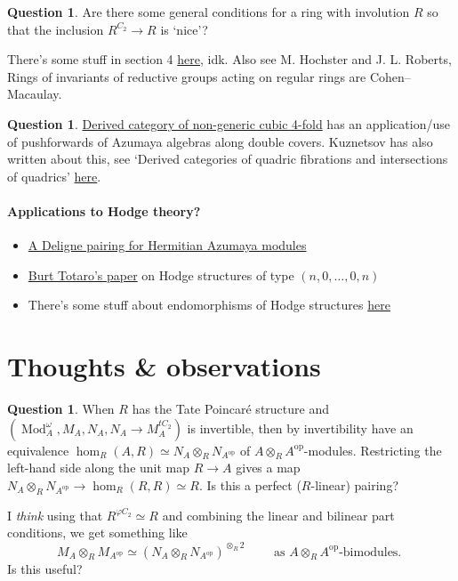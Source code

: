 \documentclass{article}
\DeclareMathOperator{\Mod}{Mod} %
\newcommand{\op}{\mathrm{op}}
\theoremstyle{definition}
\newtheorem{question}[equation]{Question}
\begin{document}
\begin{question}
    Are there some general conditions for a ring with involution $ R $ so that the inclusion $ R^{C_2} \to R $ is `nice'?

    There's some stuff in section 4 \href{https://www.math.nagoya-u.ac.jp/~hasimoto/paper/knop2.pdf}{here}, idk. 
    Also see M. Hochster and J. L. Roberts, Rings of invariants of reductive groups acting on regular rings are Cohen–Macaulay. 
\end{question}
\begin{question}
    \href{https://arxiv.org/pdf/1607.06392}{Derived category of non-generic cubic 4-fold} has an application/use of pushforwards of Azumaya algebras along double covers. 
    Kuznetsov has also written about this, see `Derived categories of quadric fibrations and intersections of quadrics' \href{https://homepage.mi-ras.ru/~akuznet/publications/DerivedCategoriesOfQuadricFibrationsAndIntersectionsOfQuadrics.pdf}{here}.
\end{question}

\paragraph{Applications to Hodge theory?} 
\begin{itemize}
    \item \href{https://arxiv.org/abs/1501.05294}{A Deligne pairing for Hermitian Azumaya modules}
    \item \href{https://www.math.ucla.edu/~totaro/papers/public_html/structure.pdf}{Burt Totaro's paper} on Hodge structures of type $ (n,0,\ldots, 0, n) $
    \item There's some stuff about endomorphisms of Hodge structures \href{https://webusers.imj-prg.fr/~claire.voisin/Articlesweb/verbanianotes.pdf}{here}
\end{itemize}

\section{Thoughts \& observations}
\begin{question}
   When $ R $ has the Tate Poincaré structure and $ (\Mod_A^\omega, M_A, N_A, N_A \to M_A^{tC_2}) $ is invertible, then by invertibility have an equivalence $ \hom_R(A, R)\simeq N_A\otimes_R N_{A^\op} $ of $ A \otimes_R A^\op $-modules. 
   Restricting the left-hand side along the unit map $ R \to A $ gives a map $ N_A \otimes_R N_{A^\op} \to \hom_R(R,R) \simeq R $. 
   Is this a perfect ($R$-linear) pairing? 

   I \emph{think} using that $ R^{\varphi C_2} \simeq R $ and combining the linear and bilinear part conditions, we get something like
   \begin{equation*}
       M_A \otimes_R M_{A^\op} \simeq (N_A \otimes_R N_{A^\op})^{\otimes_R 2} \qquad \text{ as $A \otimes_R A^\op$-bimodules. }
   \end{equation*}
   Is this useful?
\end{question}
\end{document}
